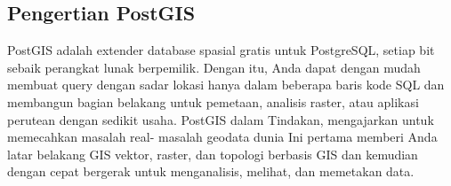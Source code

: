 \subsection{Pengertian PostGIS}
PostGIS adalah extender database spasial gratis untuk PostgreSQL, 
setiap bit sebaik perangkat lunak berpemilik. Dengan itu, 
Anda dapat dengan mudah membuat query dengan sadar lokasi hanya dalam beberapa baris kode SQL 
dan membangun bagian belakang untuk pemetaan, analisis raster, 
atau aplikasi perutean dengan sedikit usaha. 
PostGIS dalam Tindakan, mengajarkan untuk memecahkan masalah real- 
masalah geodata dunia Ini pertama memberi Anda latar belakang GIS vektor,
raster, dan topologi berbasis GIS dan kemudian dengan cepat bergerak 
untuk menganalisis, melihat, dan memetakan data. 
